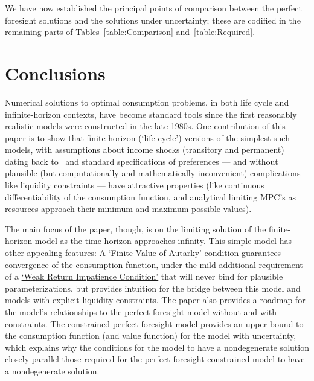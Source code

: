 \documentclass[BufferStockTheory]{subfiles}
\begin{document}
We have now established the principal points of comparison between the perfect foresight solutions and the solutions under uncertainty; these are codified in the remaining parts of Tables~\ref{table:Comparison} and~\ref{table:Required}.

\hypertarget{Factors-Defined-And-Compared}{}


\hypertarget{Required}{}
\reversemarginpar{}




\newpage 
\hypertarget{Conclusions}{}
\section{Conclusions}

Numerical solutions to optimal consumption problems, in both life cycle and infinite-horizon contexts, have become standard tools since the first reasonably realistic models were constructed in the late 1980s. One contribution of this paper is to show that finite-horizon (`life cycle') versions of the simplest such models, with assumptions about income shocks (transitory and permanent) dating back to~\cite{friedmanATheory} and standard specifications of preferences --- and without plausible (but computationally and mathematically inconvenient) complications like liquidity constraints --- have attractive properties (like continuous differentiability of the consumption function, and analytical limiting MPC's as resources approach their minimum and maximum possible values).%

The main focus of the paper, though, is on the limiting solution of the finite-horizon model as the time horizon approaches infinity.  This simple model has other appealing features: A \hyperlink{FVAC}{`Finite Value of Autarky'} condition guarantees convergence of the consumption function, under the mild additional requirement of a \hyperlink{WRIC}{`Weak Return Impatience Condition'} that will never bind for plausible parameterizations, but provides intuition for the bridge between this model and models with explicit liquidity constraints. The paper also provides a roadmap for the model's relationships to the perfect foresight model without and with constraints.  The constrained perfect foresight model provides an upper bound to the consumption function (and value function) for the model with uncertainty, which explains why the conditions for the model to have a nondegenerate solution closely parallel those required for the perfect foresight constrained model to have a nondegenerate solution.
\end{document}

